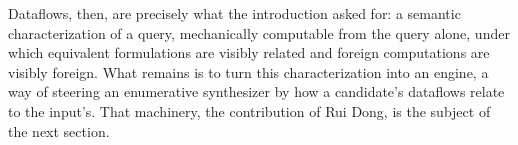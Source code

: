 Dataflows, then, are precisely what the introduction asked for: a
semantic characterization of a query, mechanically computable from the
query alone, under which equivalent formulations are visibly related
and foreign computations are visibly foreign. What remains is to turn
this characterization into an engine, a way of steering an enumerative
synthesizer by how a candidate's dataflows relate to the input's. That
machinery, the contribution of Rui Dong, is the subject of the next
section.
